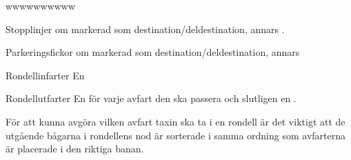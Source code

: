 \documentclass[tekniskrapport/tech.tex]{subfiles}
\begin{document}
\begin{labeling}{wwwwwwwwww}
\item[Stopplinjer] {\commStop} om markerad som destination/deldestination,
annars \commIgnore.

\item[Parkeringsfickor] {\commPark} om markerad som destination/deldestination,
annars \commIgnore 

\item[Rondellinfarter] En \commEnter

\item[Rondellutfarter] En {\commContinue} för varje
avfart den ska passera och slutligen en \commExit.

\end{labeling}
För att kunna avgöra vilken avfart taxin ska ta i en rondell är det viktigt att
de utgående bågarna i rondellens nod är sorterade i samma ordning som
avfarterna är placerade i den riktiga banan.
\end{document}
